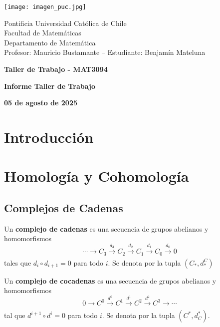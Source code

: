 \documentclass{article}
\begin{document}
\begin{minipage}{2.5cm}
    \texttt{[image: imagen\_puc.jpg]}
\end{minipage}
\begin{minipage}{14cm}
    {\sc Pontificia Universidad Católica de Chile\\
    Facultad de Matemáticas\\
    Departamento de Matemática\\
    Profesor: Mauricio Bustamante -- Estudiante: Benjamín Mateluna}
\end{minipage}
\vspace{1ex}

{\centerline{\bf Taller de Trabajo - MAT3094}
\centerline{\bf Informe Taller de Trabajo}}
\centerline{\bf 05 de agosto de 2025}

\newpage
\tableofcontents

\newpage
\section*{Introducción}
{}

\newpage
\section{Homología y Cohomología}
\subsection{Complejos de Cadenas}
\begin{dfn}
    Un \textbf{complejo de cadenas} es una secuencia de grupos abelianos y homomorfismos
    \begin{equation*}
        \cdots\xrightarrow[]{}C_{3}\xrightarrow[]{d_{3}}C_{2}\xrightarrow[]{d_{2}}C_{1}
        \xrightarrow[]{d_{1}}C_{0}\xrightarrow[]{d_{0}}0
    \end{equation*}
    tales que $d_{i}\circ d_{i+1}=0$ para todo $i$. Se denota por la tupla $(C_{*},d_{*}^{C})$
\end{dfn}

\begin{dfn}
    Un \textbf{complejo de cocadenas} es una secuencia de grupos abelianos y homomorfismos
    \begin{equation*}
        0\xrightarrow[]{}C^{0}\xrightarrow[]{d^{0}}C^{1}\xrightarrow[]{d^{1}}C^{2}
        \xrightarrow[]{d^{2}}C^{3}\to\cdots
    \end{equation*}
    tal que $d^{i+1}\circ d^{i}=0$ para todo $i$. Se denota por la tupla $(C^{*},d_{C}^{*})$.
\end{dfn}
\end{document}
